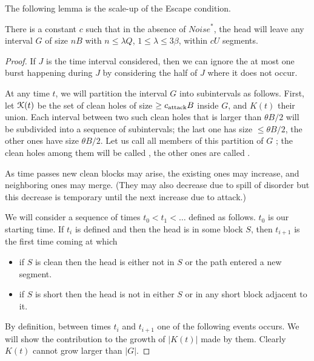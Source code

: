 \documentclass[11pt]{memoir}
\theoremstyle{definition} %
\renewcommand{\le}{\leq}
\renewcommand{\ge}{\geq}
\def\B{B}
\def\U{U}
\newcommand{\Noise}{\mathit{Noise}}
\newcommand{\Q}{Q}
\newcommand{\Tu}{T}
\newcommand{\cns}[1]{c_{\textrm{\upshape #1}}}
\newcommand{\CAtt}{\cns{attack}}
\newcommand{\CEsc}{\cns{esc}}
\begin{document}
The following lemma is the scale-up of the Escape condition.

\begin{lemma}[Escape]\label{lem:escape}
  There is a constant \( c \) such that in the absence of \( \Noise^{*} \), the
  head will leave any interval \( G \) of size \( n\B \) with \(n\le\lambda\Q \),
  \( 1\le\lambda\le 3\beta \), within \( c\U \) segments.
\end{lemma}
\begin{proof}
  If \( J \) is the time interval considered, then we can ignore the at most one
  burst happening during \( J \) by considering the half of \( J \) where it does not occur.

  At any time \( t \), we will partition the interval \( G \) into subintervals as follows.
  First, let \( \mathcal{K}(t) \) be the set of clean holes of size \( \ge\CAtt\B \) inside \( G \),
  and \( K(t) \) their union.
  Each interval between two such clean holes that is larger
  than \( \theta\B/2 \) will be subdivided into a sequence of subintervals; the last one
  has size \( \le \theta\B/2 \), the other ones have size \( \theta\B/2 \).
  Let us call all members of this partition of \( G \) ;
  the clean holes among them will be called , the other ones are called .

  As time passes new clean blocks may arise, the existing ones may
  increase, and neighboring ones may merge.
  (They may also decrease due to spill of disorder but this decrease is temporary until the next increase
  due to attack.)

  We will consider a sequence of times \( t_{0}<t_{1}<\dots \) defined as follows.
  \( t_{0} \) is our starting time.
  If \( t_{i} \) is defined and then the head is in some block \( S \),
  then \( t_{i+1} \) is the first time coming at which 
  \begin{itemize}
  \item if \( S \) is clean then the head is either not in \( S \) or the path entered a new segment.
  \item if \( S \) is short then the head is not in either \( S \) or in any short block adjacent to it.
  \end{itemize}
  By definition, between times \( t_{i} \) and \( t_{i+1} \) one of the following events occurs.
  We will show the contribution to the growth of \( |K(t)| \) made by them.
  Clearly \( K(t) \) cannot grow larger than \( |G| \).
  

\end{proof}
\end{document}
